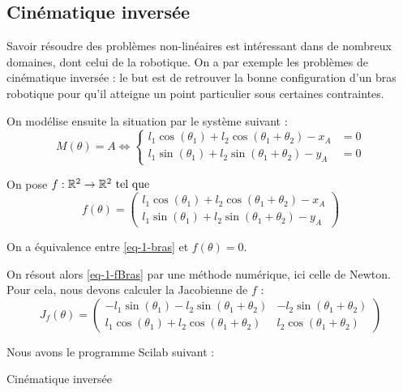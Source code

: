 	\subsection{Cinématique inversée}
		Savoir résoudre des problèmes non-linéaires est intéressant dans de nombreux domaines, dont celui de la robotique. On a par exemple les problèmes de cinématique inversée : le but est de retrouver la bonne configuration d'un bras robotique pour qu'il atteigne un point particulier sous certaines contraintes.


		On modélise ensuite la situation par le système suivant :
		\begin{equation}
		\label{eq-1-bras}
			M(\theta)=A \iff
			\begin{cases}
				l_1\cos(\theta_1) + l_2\cos(\theta_1 + \theta_2) - x_A &= 0 \\
				l_1\sin(\theta_1) + l_2\sin(\theta_1 + \theta_2) - y_A &= 0 				
			\end{cases}
		\end{equation}
		
		On pose $f : \mathbb{R}^2 \to \mathbb{R}^2 \text{ tel que }$
		\begin{equation}
		\label{eq-1-fBras}
			f(\theta) = 
			\begin{pmatrix}
				l_1\cos(\theta_1) + l_2\cos(\theta_1 + \theta_2) - x_A \\
				l_1\sin(\theta_1) + l_2\sin(\theta_1 + \theta_2) - y_A			
			\end{pmatrix}
		\end{equation}

		On a équivalence entre \eqref{eq-1-bras} et $f(\theta) = 0$.

		On résout alors \eqref{eq-1-fBras} par une méthode numérique, ici celle de Newton.
		Pour cela, nous devons calculer la Jacobienne de $f$ :
		$$
			J_f(\theta) = \begin{pmatrix}
				-l_1\sin(\theta_1) - l_2\sin(\theta_1 + \theta_2)
				&	-l_2\sin(\theta_1 + \theta_2)
				\\
				l_1\cos(\theta_1) + l_2\cos(\theta_1 + \theta_2)
				&	l_2\cos(\theta_1 + \theta_2)
			\end{pmatrix}
		$$

		Nous avons le programme Scilab suivant :

		\begin{listing}[H]
			\caption{Cinématique inversée}
			\label{code-1-cinematiqueInversee}
		\end{listing}

